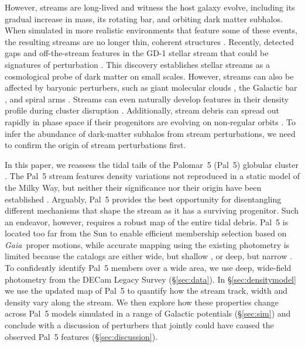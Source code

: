 \documentclass[twocolumn]{aastex62}
\newcommand{\gaia}{\textsl{Gaia}}
\begin{document}
However, streams are long-lived and witness the host galaxy evolve, including its gradual increase in mass, its rotating bar, and orbiting dark matter subhalos.
When simulated in more realistic environments that feature some of these events, the resulting streams are no longer
thin, coherent structures \citep[e.g.,][]{Bonaca:2014, Ngan:2015, Price-Whelan:2016b}. Recently, \citet{Price-Whelan:2018} detected gaps and off-the-stream features in the GD-1 stellar stream that could be signatures of perturbation \citep{Bonaca:2018b}.
This discovery establishes stellar streams as a cosmological probe of dark matter on small scales.
However, streams can also be affected by baryonic perturbers, such as giant molecular clouds \citep{Amorisco:2016}, the Galactic bar \citep{Pearson:2017}, and spiral arms \citep{Banik:2019}.
Streams can even naturally develop features in their density profile during cluster disruption \citep[e.g.,][]{Kupper:2008, Just:2009}.
Additionally, stream debris can spread out rapidly in phase space if their progenitors are evolving on non-regular orbits \citep[e.g.,][]{Pearson:2015, Fardal:2015, Price-Whelan:2016}.
To infer the abundance of dark-matter subhalos from stream perturbations, we need to confirm the origin of stream perturbations first.

In this paper, we reassess the tidal tails of the Palomar~5 (Pal~5) globular cluster \citep{Odenkirchen:2001, Rockosi:2002}.
The Pal~5 stream features density variations not reproduced in a static model of the Milky Way, but neither their significance nor their origin have been established \citep{Carlberg:2012, Bernard:2016, Ibata:2016, Erkal:2017}.
Arguably, Pal~5 provides the best opportunity for disentangling different mechanisms that shape the stream as it has a surviving progenitor.
Such an endeavor, however, requires a robust map of the entire tidal debris.
Pal~5 is located too far from the Sun to enable efficient membership selection based on \gaia\ proper motions, while accurate mapping using the existing photometry is limited because the catalogs are either wide, but shallow \citep{Bernard:2016}, or deep, but narrow \citep{Ibata:2016}.
To confidently identify Pal~5 members over a wide area, we use deep, wide-field photometry from the DECam Legacy Survey (\S\ref{sec:data}).
In \S\ref{sec:densitymodel} we use the updated map of Pal~5 to quantify how the stream track, width and density vary along the stream.
We then explore how these properties change across Pal~5 models simulated in a range of Galactic potentials (\S\ref{sec:sim}) and conclude with a discussion of perturbers that jointly could have caused the observed Pal~5 features (\S\ref{sec:discussion}).
\end{document}
